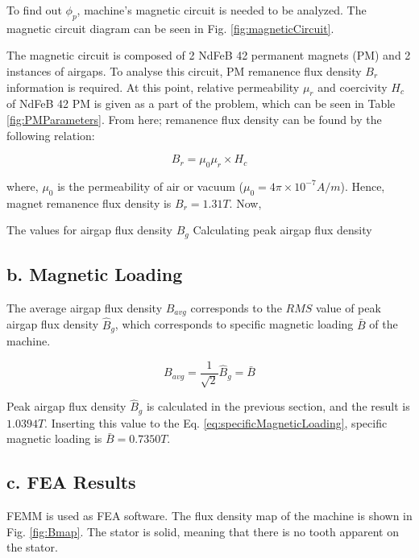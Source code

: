 \documentclass[a4paper, 11pt, titlepage]{article}
\begin{document}
To find out $\phi_p$, machine's magnetic circuit is needed to be analyzed. The magnetic circuit diagram can be seen in Fig. \ref{fig:magneticCircuit}. 

The magnetic circuit is composed of 2 NdFeB 42 permanent magnets (PM) and 2 instances of airgaps. To analyse this circuit, PM remanence flux density $B_r$ information is required. At this point, relative permeability $\mu_r$ and coercivity $H_c$ of NdFeB 42 PM is given as a part of the problem, which can be seen in Table \ref{fig:PMParameters}. From here; remanence flux density can be found by the following relation:

\begin{equation}
	B_r = \mu_0\mu_r\times H_c 
	\label{label:remanenceFluxDensity}
\end{equation}

where, $\mu_0$ is the permeability of air or vacuum ($\mu_0=4\pi \times 10^{-7}A/m$). Hence, magnet remanence flux density  is $B_r=1.31 T$. Now,



The values for airgap flux density $B_g$ Calculating peak airgap flux density 


\subsection{b. Magnetic Loading}
\label{sec:specificMagneticLoading}

The average airgap flux density $B_{avg}$ corresponds to the $RMS$ value of peak airgap flux density $\hat{B}_g$, which corresponds to specific magnetic loading $\bar{B}$ of the machine.

\begin{equation}
	B_{avg} = \frac{1}{\sqrt{2}}\hat{B}_g = \bar{B}
	\label{eq:specificMagneticLoading}
\end{equation}

Peak airgap flux density $\hat{B}_g$ is calculated in the previous section, and the result is $1.0394T$. Inserting this value to the Eq. \ref{eq:specificMagneticLoading}, specific magnetic loading is $\bar{B}=0.7350T$.


\subsection{c. FEA Results}

FEMM is used as FEA software. The flux density map of the machine is shown in Fig. \ref{fig:Bmap}. The stator is solid, meaning that there is no tooth apparent on the stator.
\end{document}
